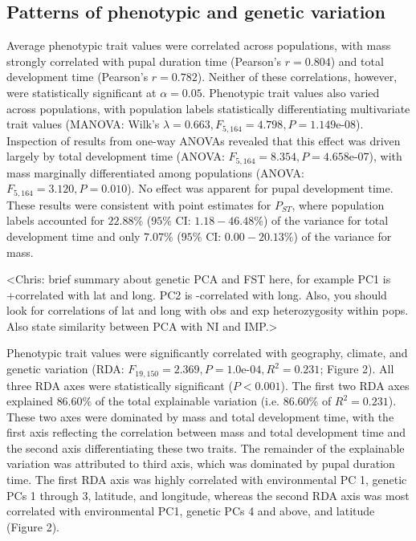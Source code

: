 \documentclass[smallextended]{svjour3}
\begin{document}
\subsection*{Patterns of phenotypic and genetic variation} Average phenotypic
trait values were correlated across populations, with mass strongly correlated
with pupal duration time (Pearson's $r = 0.804$) and total development time
(Pearson's $r = 0.782$).  Neither of these correlations, however, were
statistically significant at $\alpha = 0.05$. Phenotypic trait values also
varied across populations, with population labels statistically differentiating
multivariate trait values (MANOVA: Wilk's $\lambda = 0.663, F_{5,164} = 4.798,P =
1.149$e-$08$). Inspection of results from one-way ANOVAs revealed that this
effect was driven largely by total development time (ANOVA: $F_{5,164} = 8.354,P =
4.658$e-$07$), with mass marginally differentiated among populations (ANOVA:
$F_{5,164} = 3.120,P = 0.010$). No effect was apparent for pupal development
time. These results were consistent with point estimates for $P_{ST}$, where
population labels accounted for $22.88\%$ ($95\%$ CI: $1.18 - 46.48\%$) of the
variance for total development time and only $7.07\%$ ($95\%$ CI: $0.00 -
20.13\%$) of the variance for mass.

<Chris: brief summary about genetic PCA and FST here, for example PC1 is
+correlated with lat and long. PC2 is -correlated with long. Also, you should
look for correlations of lat and long with obs and exp heterozygosity within
pops. Also state similarity between PCA with NI and IMP.>

Phenotypic trait values were significantly correlated with geography, climate,
and genetic variation (RDA: $F_{19,150} = 2.369, P = 1.0$e-$04, R^2 = 0.231$;
Figure 2). All three RDA axes were statistically significant ($P < 0.001$). 
The first two RDA axes explained $86.60\%$ of the total
explainable variation (i.e. $86.60\%$ of $R^2 = 0.231$). These two axes were
dominated by mass and total development time, with the first axis reflecting the
correlation between mass and total development time and the second axis
differentiating these two traits. The remainder of the explainable variation was
attributed to third axis, which was dominated by pupal duration time. The first
RDA axis was highly correlated with environmental PC 1, genetic PCs 1 through 3,
latitude, and longitude, whereas the second RDA axis was most correlated with
environmental PC1, genetic PCs 4 and above, and latitude (Figure 2).
\end{document}
